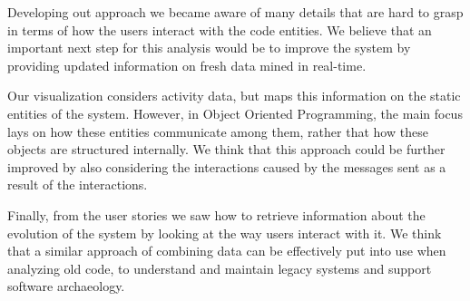 Developing out approach we became aware of many details that are hard to grasp in terms of how the users interact with the code entities.
We believe that an important next step for this analysis would be to improve the system by providing updated information on fresh data mined in real-time.

Our visualization considers activity data, but maps this information on the static entities of the system.
However, in Object Oriented Programming, the main focus lays on how these entities communicate among them, rather that how these objects are structured internally.
We think that this approach could be further improved by also considering the interactions caused by the messages sent as a result of the interactions.

Finally, from the user stories we saw how to retrieve information about the evolution of the system by looking at the way users interact with it.
We think that a similar approach of combining data can be effectively put into use when analyzing old code, to understand and maintain legacy systems and support software archaeology.
